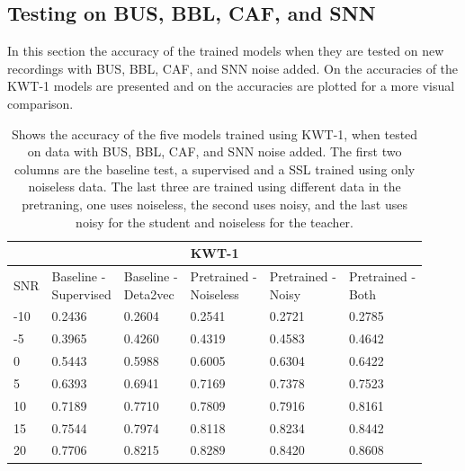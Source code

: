 \subsection{Testing on BUS, BBL, CAF, and SNN}\label{subsec:test2}
In this section the accuracy of the trained models when they are tested on new recordings with BUS, BBL, CAF, and SNN noise added. On  the accuracies of the KWT-1 models are presented and on  the accuracies are plotted for a more visual comparison. 

\begin{table}[H]
    \centering
    \begin{tabular}{@{}llllll@{}}
        \multicolumn{6}{c}{\textbf{KWT-1}}\\
        \toprule
        SNR    & \makecell[l]{ Baseline - \\ Supervised } & \makecell[l]{ Baseline - \\ Deta2vec } & \makecell[l]{ Pretrained - \\ Noiseless } & \makecell[l]{ Pretrained - \\ Noisy } & \makecell[l]{ Pretrained - \\ Both } \\ \midrule
        -10  & 0.2436 & 0.2604 & 0.2541 & 0.2721 & 0.2785 \\
        -5   & 0.3965 & 0.4260 & 0.4319 & 0.4583 & 0.4642 \\
        0    & 0.5443 & 0.5988 & 0.6005 & 0.6304 & 0.6422 \\
        5    & 0.6393 & 0.6941 & 0.7169 & 0.7378 & 0.7523 \\
        10   & 0.7189 & 0.7710 & 0.7809 & 0.7916 & 0.8161 \\
        15   & 0.7544 & 0.7974 & 0.8118 & 0.8234 & 0.8442 \\
        20   & 0.7706 & 0.8215 & 0.8289 & 0.8420 & 0.8608 \\
        
        \bottomrule
    \end{tabular}
    \caption{Shows the accuracy of the five models trained using KWT-1, when tested on data with BUS, BBL, CAF, and SNN noise added. The first two columns are the baseline test, a supervised and a SSL trained using only noiseless data. The last three are trained using different data in the pretraning, one uses noiseless, the second uses noisy, and the last uses noisy for the student and noiseless for the teacher.}
    \label{tab:KWT-1_snrmix_busxbblxcafxssn}
\end{table}

